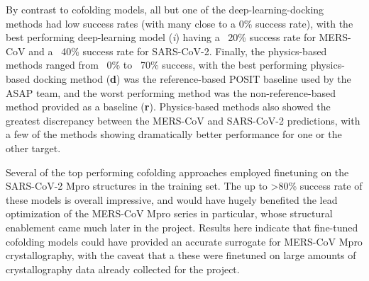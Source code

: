 \documentclass[journal=jcim,manuscript=article]{achemso}
\begin{document}
By contrast to cofolding models, all but one of the deep-learning-docking methods had low success rates (with many close to a 0\% success rate), with the best performing deep-learning model (\textit{i}) having a ~20\% success rate for MERS-CoV and a ~40\% success rate for SARS-CoV-2. Finally, the physics-based methods ranged from ~0\% to ~70\% success, with the best performing physics-based docking method (\textbf{d}) was the reference-based POSIT baseline used by the ASAP team, and the worst performing method was the non-reference-based method provided as a baseline (\textbf{r}). Physics-based methods also showed the greatest discrepancy between the MERS-CoV and SARS-CoV-2 predictions, with a few of the methods showing dramatically better performance for one or the other target. 

Several of the top performing cofolding approaches employed finetuning on the SARS-CoV-2 Mpro structures in the training set. The up to \textgreater 80\% success rate of these models is overall impressive, and would have hugely benefited the lead optimization of the MERS-CoV Mpro series in particular, whose structural enablement came much later in the project. Results here indicate that fine-tuned cofolding models could have provided an accurate surrogate for MERS-CoV Mpro crystallography, with the caveat that a these were finetuned on large amounts of crystallography data already collected for the project.
\end{document}
